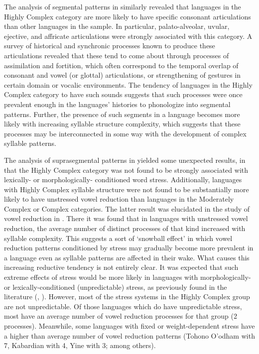   The analysis of segmental patterns in  similarly revealed that languages in the Highly Complex category are more likely to have specific consonant articulations than other languages in the sample. In particular, palato-alveolar, uvular, ejective, and affricate articulations were strongly associated with this category. A survey of historical and synchronic processes known to produce these articulations revealed that these tend to come about through processes of assimilation and fortition, which often correspond to the temporal overlap of consonant and vowel (or glottal) articulations, or strengthening of gestures in certain domain or vocalic environments. The tendency of languages in the Highly Complex category to have such sounds suggests that such processes were once prevalent enough in the languages’ histories to phonologize into segmental patterns. Further, the presence of such segments in a language becomes more likely with increasing syllable structure complexity, which suggests that these processes may be interconnected in some way with the development of complex syllable patterns.

  The analysis of suprasegmental patterns in  yielded some unexpected results, in that the Highly Complex category was not found to be strongly associated with lexically- or morphologically- conditioned word stress. Additionally, languages with Highly Complex syllable structure were not found to be substantially more likely to have unstressed vowel reduction than languages in the Moderately Complex or Complex categories. The latter result was elucidated in the study of vowel reduction in . There it was found that in languages with unstressed vowel reduction, the average number of distinct processes of that kind increased with syllable complexity. This suggests a sort of ‘snowball effect’ in which vowel reduction patterns conditioned by stress may gradually become more prevalent in a language even as syllable patterns are affected in their wake. What causes this increasing reductive tendency is not entirely clear. It was expected that such extreme effects of stress would be more likely in languages with morphologically- or lexically-conditioned (unpredictable) stress, as previously found in the literature (\citealt{BybeeEtAl1998}, \citealt{Schiering2007}). However, most of the stress systems in the Highly Complex group are not unpredictable. Of those languages which do have unpredictable stress, most have an average number of vowel reduction processes for that group (2 processes). Meanwhile, some languages with fixed or weight-dependent stress have a higher than average number of vowel reduction patterns (Tohono O’odham with 7, Kabardian with 4, Yine with 3; among others). 

